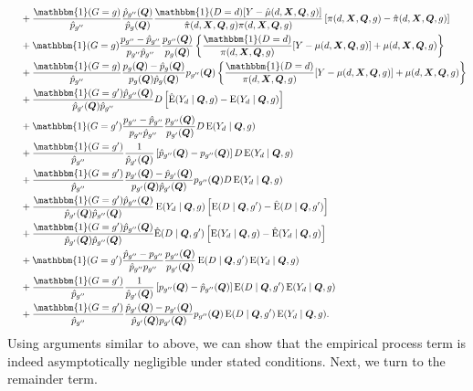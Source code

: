 \documentclass[12pt,a4paper]{article}
\newcommand{\E}{\operatorname{E}}
\def\X{{\boldsymbol X}}
\def\Q{{\boldsymbol Q}}
\def\one{\mathbbm{1}}
\begin{document}
\begin{align*}
    &\phantom{{}={}} + \frac{\one(G=g)}{\hat{p}_{g''}}\frac{\hat{p}_{g''}(\Q)}{\hat{p}_{g}(\Q)} \frac{\one(D=d)[Y-\hat{\mu}(d,\X,\Q,g)]}{\hat{\pi}(d,\X,\Q,g)\pi(d,\X,\Q,g)}\left[\pi(d,\X,\Q,g)-\hat{\pi}(d,\X,\Q,g)\right] \\
    &\phantom{{}={}} + \one(G=g)\frac{p_{g''}-\hat{p}_{g''}}{p_{g''}\hat{p}_{g''}} \frac{p_{g''}(\Q)}{p_g(\Q)} \left\{ \frac{\one(D=d)}{\pi(d,\X,\Q,g)} [Y-\mu(d,\X,\Q,g)] + \mu(d,\X,\Q,g) \right\} \\
    &\phantom{{}={}} + \frac{\one(G=g)}{\hat{p}_{g''}} \frac{p_g(\Q)-\hat{p}_g(\Q)}{p_g(\Q)\hat{p}_g(\Q)}p_{g''}(\Q) \left\{ \frac{\one(D=d)}{\pi(d,\X,\Q,g)} [Y-\mu(d,\X,\Q,g)] + \mu(d,\X,\Q,g) \right\} \\
    &\phantom{{}={}} + \frac{\one(G=g')\hat{p}_{g''}(\Q)}{\hat{p}_{g'}(\Q)\hat{p}_{g''}} D \left[ \hat{\E}(Y_d \mid \Q,g)-\E(Y_d \mid \Q,g) \right] \\
    &\phantom{{}={}} + \one(G=g')\frac{p_{g''}-\hat{p}_{g''}}{p_{g''}\hat{p}_{g''}} \frac{p_{g''}(\Q)}{p_{g'}(\Q)}D\E(Y_d \mid \Q,g) \\
    &\phantom{{}={}} + \frac{\one(G=g')}{\hat{p}_{g''}} \frac{1}{\hat{p}_{g'}(\Q)} \left[ \hat{p}_{g''}(\Q)-p_{g''}(\Q) \right] D \E(Y_d \mid \Q,g) \\
    &\phantom{{}={}} + \frac{\one(G=g')}{\hat{p}_{g''}} \frac{p_{g'}(\Q)-\hat{p}_{g'}(\Q)}{p_{g'}(\Q)\hat{p}_{g'}(\Q)} p_{g''}(\Q) D \E(Y_d \mid \Q,g) \\
    &\phantom{{}={}} + \frac{\one(G=g')\hat{p}_{g''}(\Q)}{\hat{p}_{g'}(\Q) \hat{p}_{g''}(\Q)} \E(Y_d \mid \Q,g) \left[ \E(D \mid \Q,g')-\hat{\E}(D \mid \Q,g') \right] \\
    &\phantom{{}={}} + \frac{\one(G=g')\hat{p}_{g''}(\Q)}{\hat{p}_{g'}(\Q) \hat{p}_{g''}(\Q)} \hat{\E}(D \mid \Q,g')\left[ \E(Y_d \mid \Q,g)-\hat{\E}(Y_d \mid \Q,g) \right] \\
    &\phantom{{}={}} + \one(G=g')\frac{\hat{p}_{g''}-p_{g''}}{\hat{p}_{g''}p_{g''}} \frac{p_{g''}(\Q)}{p_{g'}(\Q)} \E(D \mid \Q,g') \E(Y_d \mid \Q,g) \\
    &\phantom{{}={}} + \frac{\one(G=g')}{\hat{p}_{g''}} \frac{1}{\hat{p}_{g'}(\Q)} \left[ p_{g''}(\Q)-\hat{p}_{g''}(\Q) \right] \E(D \mid \Q,g')\E(Y_d \mid \Q,g) \\
    &\phantom{{}={}} + \frac{\one(G=g')}{\hat{p}_{g''}} \frac{\hat{p}_{g'}(\Q)-p_{g'}(\Q)}{\hat{p}_{g'}(\Q)p_{g'}(\Q)} p_{g''}(\Q) \E(D \mid \Q,g')\E(Y_d \mid \Q,g).
\end{align*}
Using arguments similar to above, we can show that the empirical process term is indeed asymptotically negligible under stated conditions. Next, we turn to the remainder term.
\end{document}
